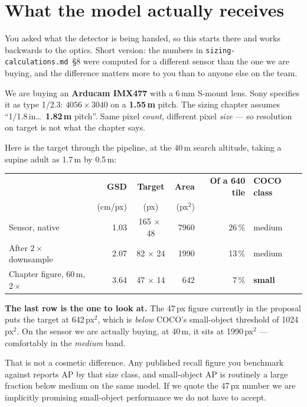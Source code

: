 \documentclass[11pt,a4paper]{article}
\begin{document}
\vspace*{-6mm}

\section{What the model actually receives}

You asked what the detector is being handed, so this starts there and works
backwards to the optics. Short version: the numbers in
\texttt{sizing-calculations.md}~\S8 were computed for a different sensor than
the one we are buying, and the difference matters more to you than to anyone
else on the team.

We are buying an \textbf{Arducam IMX477} with a 6\,mm S-mount lens. Sony
specifies it as type 1/2.3: $4056\times3040$ on a \textbf{1.55\,\textmu m}
pitch. The sizing chapter assumes ``1/1.8\,in\ldots\ \textbf{1.82\,\textmu m}
pitch''. Same pixel \emph{count}, different pixel \emph{size} --- so
resolution on target is not what the chapter says.

Here is the target through the pipeline, at the 40\,m search altitude, taking a
supine adult as 1.7\,m by 0.5\,m:

\begin{center}
\begin{tabular}{l r c r r l}
\toprule
 & \textbf{GSD} & \textbf{Target} & \textbf{Area} &
\textbf{Of a 640 tile} & \textbf{COCO class} \\
 & (cm/px) & (px) & (px$^2$) & & \\
\midrule
Sensor, native & 1.03 & 165$\,\times\,$48 & 7960 & 26\,\% & medium \\
After $2\times$ downsample & 2.07 & 82$\,\times\,$24 & 1990 & 13\,\% & medium \\
Chapter figure, 60\,m, $2\times$ & 3.64 & 47$\,\times\,$14 & 642 & 7\,\% & \textcolor{warn}{\textbf{small}} \\
\bottomrule
\end{tabular}
\end{center}

\textbf{The last row is the one to look at.} The 47\,px figure currently in
the proposal puts the target at 642\,px$^2$, which is
\emph{below} COCO's small-object threshold of 1024\,px$^2$. On the
sensor we are actually buying, at 40\,m, it sits at
1990\,px$^2$ --- comfortably in the \emph{medium} band.

That is not a cosmetic difference. Any published recall figure you benchmark
against reports AP by that size class, and small-object AP is routinely a large
fraction below medium on the same model. If we quote the 47\,px number we are
implicitly promising small-object performance we do not have to accept.
\end{document}

